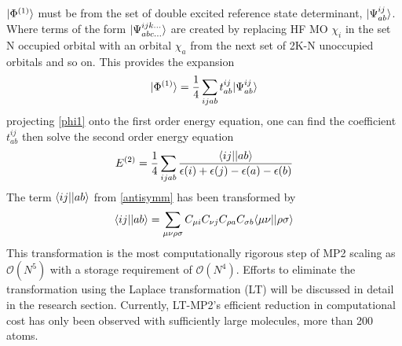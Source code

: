        $| \Phi^{(1)} \rangle$ must be from the set of double excited reference state determinant, $| \Psi^{ij}_{ab} \rangle$. Where terms of the form $| \Psi^{ijk\dots}_{abc\dots} \rangle$ are created by replacing HF MO $\chi_i$ in the set N occupied orbital with an orbital $\chi_a$ from the next set of 2K-N unoccupied orbitals and so on.  This provides the expansion 
         \begin{equation} \label{phi1}
          | \Phi^{(1)} \rangle 
          = \frac{1}{4}\sum_{ijab} t^{ij}_{ab} | \Psi^{ij}_{ab} \rangle
        \end{equation}
      projecting \cref{phi1} onto the first order energy equation, one can find the coefficient $t^{ij}_{ab}$ then solve the second order energy equation %
        \begin{equation}
          E^{(2)} = \frac{1}{4} \sum_{ijab} \frac{\langle ij || ab \rangle}{\epsilon{(i) + \epsilon(j) - \epsilon(a) - \epsilon(b)}}
        \end{equation}
      The term $\langle ij || ab \rangle$ from \cref{antisymm} has been transformed by
        \begin{equation}
          \langle ij || ab \rangle = \sum_{\mu\nu\rho\sigma} C_{\mu i} C_{\nu j} C_{\rho a} C_{\sigma b} \langle\mu \nu | | \rho \sigma \rangle
        \end{equation}
      This transformation is the most computationally rigorous step of MP2 scaling as $\mathcal{O}(N^5)$ with a storage requirement of $\mathcal{O}(N^4)$.  Efforts to eliminate the transformation using the Laplace transformation (LT) will be discussed in detail in the research section.  Currently, LT-MP2's efficient reduction in computational cost has only been observed with sufficiently large molecules, more than 200 atoms.   
